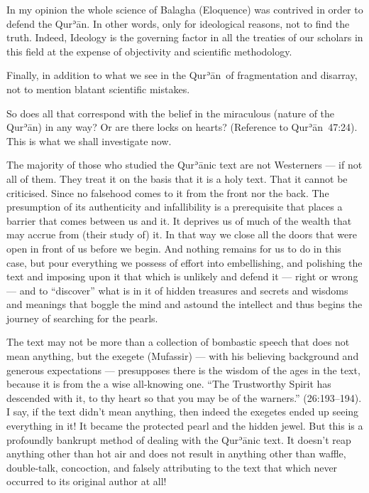 \documentclass[12pt]{memoir}
\def\´{ʾ} %
\def \Quran{Qur\-\´ān} %
\def\–{-\hskip0pt}
\newcommand{\QRef}[1]{{\color{darkblue}#1}}
\begin{document}
In my opinion the whole science of Balagha (Eloquence)
was contrived in order to defend the \Quran.
In other words, only for ideological reasons, not to find the truth.
Indeed, Ideology is the governing factor in all the treaties of our scholars
in this field at the expense of objectivity and scientific methodology.

Finally, in addition to what we see in the \Quran\ of fragmentation
and disarray, not to mention blatant scientific mistakes.

So does all that correspond with the belief in the miraculous
(nature of the \Quran) in any way?
Or are there locks on hearts?
(Reference to \Quran\ \QRef{47:24}).
This is what we shall investigate now.

The majority of those who studied the \Quran{}ic text are not Westerners —
if not all of them.
They treat it on the basis that it is a holy text.
That it cannot be criticised.
Since no falsehood comes to it from the front nor the back.
The presumption of its authenticity and infallibility is a prerequisite
that places a barrier that comes between us and it.
It deprives us of much of the wealth that may accrue from (their study of) it.
In that way we close all the doors that were open
in front of us before we begin.
And nothing remains for us to do in this case,
but pour everything we possess of effort into embellishing,
and polishing the text and imposing upon it
that which is unlikely and defend it — right or wrong —
and to “discover” what is in it of hidden treasures and secrets and
wisdoms and meanings that boggle the mind and astound the intellect and
thus begins the journey of searching for the pearls.

The text may not be more than a collection of bombastic speech
that does not mean anything, but the exegete (Mufassir) —
with his believing background and generous expectations —
presupposes there is the wisdom of the ages in the text,
because it is from the a wise all\–knowing one.
“The Trustworthy Spirit has descended with it,
to thy heart so that you may be of the warners.” (\QRef{26:193–194}).
I say, if the text didn’t mean anything,
then indeed the exegetes ended up seeing everything in it!
It became the protected pearl and the hidden jewel.
But this is a profoundly bankrupt method of dealing with the \Quran{}ic text.
It doesn’t reap anything other than hot air and does not result
in anything other than waffle, double-talk, concoction,
and falsely attributing to the text that
which never occurred to its original author at all!
\end{document}
